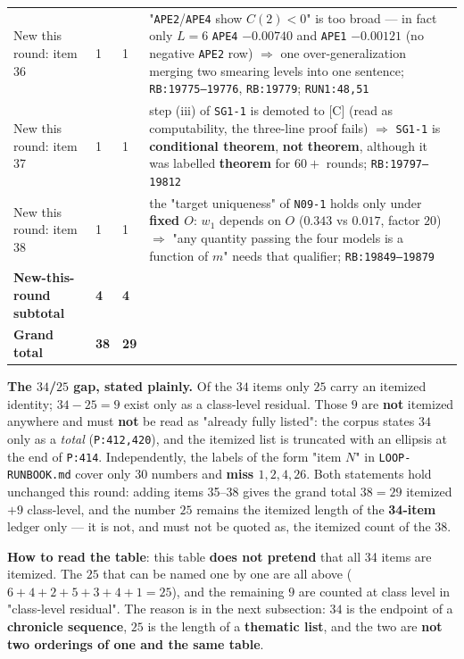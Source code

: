 \documentclass[11pt,a4paper]{article}
\newcommand{\lvT}{\textcolor{cT}{\textbf{theorem}}}
\newcommand{\lvC}{\textcolor{cC}{\textbf{conditional theorem}}}
\begin{document}
\begin{center}
\begin{tabularx}{\textwidth}{@{}L{2.1cm} L{1.2cm} L{1.45cm} Y@{}}
New this round: item 36 & 1 & 1 & "\texttt{APE2}/\texttt{APE4} show $C(2)<0$" is too broad --- in fact only $L=6$ \texttt{APE4} $-0.00740$ and \texttt{APE1} $-0.00121$ (no negative \texttt{APE2} row) $\Rightarrow$ one over-generalization merging two smearing levels into one sentence; \texttt{RB:19775--19776}, \texttt{RB:19779}; \texttt{RUN1:48,51} \\
New this round: item 37 & 1 & 1 & step (iii) of \texttt{SG1-1} is demoted to [C] (read as computability, the three-line proof fails) $\Rightarrow$ \texttt{SG1-1} is \lvC, \textbf{not} \lvT, although it was labelled \lvT{} for $60+$ rounds; \texttt{RB:19797--19812} \\
New this round: item 38 & 1 & 1 & the "target uniqueness" of \texttt{N09-1} holds only under \textbf{fixed $O$}: $w_1$ depends on $O$ ($0.343$ vs $0.017$, factor $20$) $\Rightarrow$ "any quantity passing the four models is a function of $m$" needs that qualifier; \texttt{RB:19849--19879} \\
\midrule
\textbf{New-this-round subtotal} & \textbf{4} & \textbf{4} & \\
\midrule
\textbf{Grand total} & \textbf{38} & \textbf{29} & \\
\bottomrule
\end{tabularx}
\end{center}

\begin{tcolorbox}[colback=cM!4,colframe=cM!60,boxrule=0.7pt,arc=2pt,left=7pt,right=7pt,top=5pt,bottom=5pt,breakable]
\textbf{The $34$/$25$ gap, stated plainly.} Of the $34$ items only $25$ carry an itemized identity; $34-25=9$ exist only as a class-level residual. Those $9$ are \textbf{not} itemized anywhere and must \textbf{not} be read as "already fully listed": the corpus states $34$ only as a \emph{total} (\texttt{P:412,420}), and the itemized list is truncated with an ellipsis at the end of \texttt{P:414}. Independently, the labels of the form "item $N$" in \texttt{LOOP-RUNBOOK.md} cover only $30$ numbers and \textbf{miss $1,2,4,26$}. Both statements hold unchanged this round: adding items 35--38 gives the grand total $38=29$ itemized $+$$9$ class-level, and the number $25$ remains the itemized length of the \textbf{34-item} ledger only --- it is not, and must not be quoted as, the itemized count of the $38$.
\end{tcolorbox}

\noindent\textbf{How to read the table}: this table \textbf{does not pretend} that all 34 items are itemized. The $25$ that can be named one by one are all above ($6+4+2+5+3+4+1=25$), and the remaining $9$ are counted at class level in "class-level residual". The reason is in the next subsection: $34$ is the endpoint of a \textbf{chronicle sequence}, $25$ is the length of a \textbf{thematic list}, and the two are \textbf{not two orderings of one and the same table}.
\end{document}
